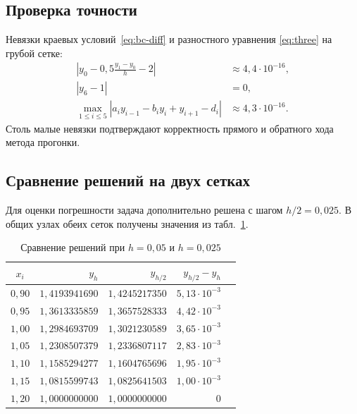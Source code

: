 \documentclass[14pt,a4paper]{extarticle}
\begin{document}
\subsection{Проверка точности}

Невязки краевых условий~\eqref{eq:bc-diff} и разностного уравнения
\eqref{eq:three} на грубой сетке:
\begin{equation}
    \begin{aligned}
        \left|y_0-0{,}5\frac{y_1-y_0}{h}-2\right| &\approx 4{,}4\cdot10^{-16},\\
        |y_6-1| &= 0,\\
        \max_{1\le i\le5}\left|a_i y_{i-1}-b_i y_i+y_{i+1}-d_i\right|
            &\approx 4{,}3\cdot10^{-16}.
    \end{aligned}
    \label{eq:residual}
\end{equation}
Столь малые невязки подтверждают корректность прямого и обратного хода
метода прогонки.

\subsection{Сравнение решений на двух сетках}

Для оценки погрешности задача дополнительно решена с шагом $h/2=0{,}025$.
В общих узлах обеих сеток получены значения из табл.~\ref{tab:compare}.

\begin{table}[H]
    \centering
    \caption{Сравнение решений при $h=0{,}05$ и $h=0{,}025$}
    \label{tab:compare}
    \small
    \begin{tabular}{crrrr}
        \toprule
        $x_i$ & $y_h$ & $y_{h/2}$ & $y_{h/2}-y_h$\\
        \midrule
        $0{,}90$ & $1{,}4193941690$ & $1{,}4245217350$ & $5{,}13\cdot10^{-3}$\\
        $0{,}95$ & $1{,}3613335859$ & $1{,}3657528333$ & $4{,}42\cdot10^{-3}$\\
        $1{,}00$ & $1{,}2984693709$ & $1{,}3021230589$ & $3{,}65\cdot10^{-3}$\\
        $1{,}05$ & $1{,}2308507379$ & $1{,}2336807117$ & $2{,}83\cdot10^{-3}$\\
        $1{,}10$ & $1{,}1585294277$ & $1{,}1604765696$ & $1{,}95\cdot10^{-3}$\\
        $1{,}15$ & $1{,}0815599743$ & $1{,}0825641503$ & $1{,}00\cdot10^{-3}$\\
        $1{,}20$ & $1{,}0000000000$ & $1{,}0000000000$ & $0$\\
        \bottomrule
    \end{tabular}
\end{table}
\end{document}
